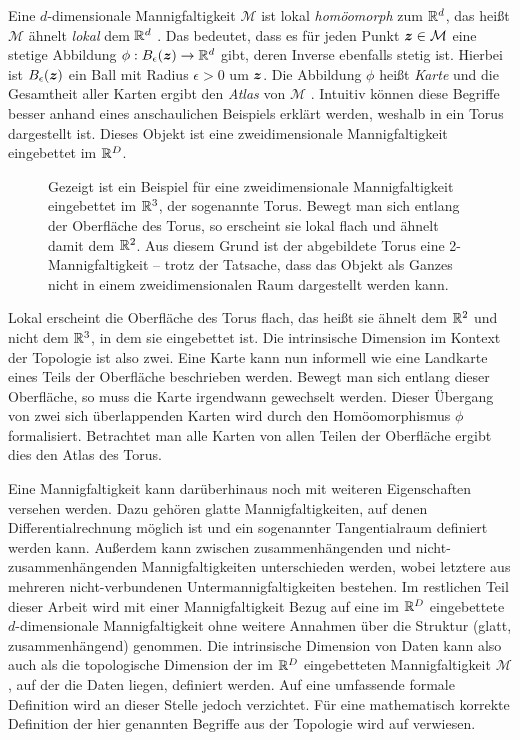 Eine $d$-dimensionale Mannigfaltigkeit $\mathcal{M}$ ist lokal \textit{homöomorph} zum $\mathbb{R}^d$,
das heißt $\mathcal{M}$ ähnelt \textit{lokal} dem $\mathbb{R}^d$ \parencite[3]{Lee.2011}. Das bedeutet, dass es für jeden Punkt $\bm{z} \in \mathcal{M}$ eine stetige
Abbildung $\phi: B_\epsilon(\bm{z}) \rightarrow \mathbb{R}^d$ gibt, deren Inverse ebenfalls stetig
ist. Hierbei ist $B_\epsilon(\bm{z})$ ein Ball mit Radius $\epsilon > 0$ um $\bm{z}$. Die
Abbildung $\phi$ heißt \textit{Karte} und die Gesamtheit aller Karten ergibt den \textit{Atlas} von
$\mathcal{M}$ \parencite[4]{Cayton.2005}. Intuitiv können diese Begriffe besser anhand eines anschaulichen Beispiels
erklärt werden, weshalb in  ein Torus dargestellt ist. Dieses Objekt ist eine
zweidimensionale Mannigfaltigkeit eingebettet im $\mathbb{R}^D$.
\begin{figure}[ht]
	\centering
	
	\caption{Gezeigt ist ein Beispiel für eine zweidimensionale Mannigfaltigkeit eingebettet im $\mathbb{R}^3$, der sogenannte Torus. Bewegt man sich entlang der Oberfläche des Torus, so erscheint sie lokal flach und ähnelt damit dem $\mathbb{R}^2$. Aus diesem Grund ist der abgebildete Torus eine 2-Mannigfaltigkeit -- trotz der Tatsache, dass das Objekt als Ganzes nicht in einem zweidimensionalen Raum dargestellt werden kann.}
	\label{fig:Torus}
\end{figure}
Lokal erscheint die Oberfläche des Torus flach, das heißt sie ähnelt dem $\mathbb{R}^2$ und nicht dem $\mathbb{R}^3$, in dem sie eingebettet ist. Die intrinsische Dimension im Kontext der Topologie ist also zwei. Eine Karte kann nun informell wie eine Landkarte eines Teils der Oberfläche beschrieben werden. Bewegt man sich entlang
dieser Oberfläche, so muss die Karte irgendwann gewechselt werden. Dieser Übergang von zwei sich
überlappenden Karten wird durch den Homöomorphismus $\phi$ formalisiert. Betrachtet man alle Karten
von allen Teilen der Oberfläche ergibt dies den Atlas des Torus.

Eine Mannigfaltigkeit kann darüberhinaus noch mit weiteren Eigenschaften versehen werden. Dazu
gehören glatte Mannigfaltigkeiten, auf denen Differentialrechnung möglich ist und ein sogenannter
Tangentialraum definiert werden kann. Außerdem kann zwischen zusammenhängenden und
nicht-zusammenhängenden Mannigfaltigkeiten unterschieden werden, wobei letztere aus mehreren
nicht-verbundenen Untermannigfaltigkeiten bestehen. Im restlichen Teil dieser Arbeit wird mit einer
Mannigfaltigkeit Bezug auf eine im $\mathbb{R}^D$ eingebettete $d$-dimensionale Mannigfaltigkeit ohne
weitere Annahmen über die Struktur (glatt, zusammenhängend) genommen. Die intrinsische Dimension
von Daten kann also auch als die topologische Dimension der im $\mathbb{R}^D$ eingebetteten
Mannigfaltigkeit $\mathcal{M}$, auf der die Daten liegen, definiert werden. Auf eine umfassende
formale Definition wird an dieser Stelle jedoch verzichtet. Für eine mathematisch korrekte
Definition der hier genannten Begriffe aus der Topologie wird auf \textcites{Lee.2011}{Lee.2012}
verwiesen.

